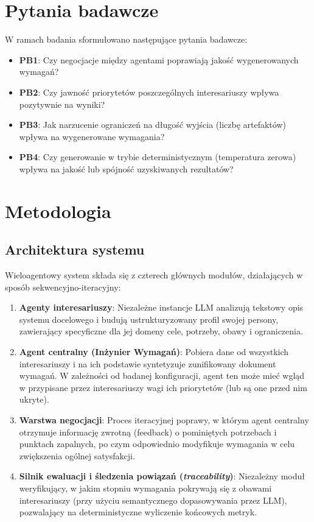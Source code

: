 \documentclass[conference]{IEEEtran}
\begin{document}
\section{Pytania badawcze}

W ramach badania sformułowano następujące pytania badawcze:

\begin{itemize}
\item \textbf{PB1}: Czy negocjacje między agentami poprawiają jakość wygenerowanych wymagań?
\item \textbf{PB2}: Czy jawność priorytetów poszczególnych interesariuszy wpływa pozytywnie na wyniki?
\item \textbf{PB3}: Jak narzucenie ograniczeń na długość wyjścia (liczbę artefaktów) wpływa na wygenerowane wymagania?
\item \textbf{PB4}: Czy generowanie w trybie deterministycznym (temperatura zerowa) wpływa na jakość lub spójność uzyskiwanych rezultatów?
\end{itemize}

\section{Metodologia}

\subsection{Architektura systemu}

Wieloagentowy system składa się z czterech głównych modułów, działających w sposób sekwencyjno-iteracyjny:

\begin{enumerate}
\item \textbf{Agenty interesariuszy}: Niezależne instancje LLM analizują tekstowy opis systemu docelowego i budują ustrukturyzowany profil swojej persony, zawierający specyficzne dla jej domeny cele, potrzeby, obawy i ograniczenia.
\item \textbf{Agent centralny (Inżynier Wymagań)}: Pobiera dane od wszystkich interesariuszy i na ich podstawie syntetyzuje zunifikowany dokument wymagań. W zależności od badanej konfiguracji, agent ten może mieć wgląd w przypisane przez interesariuszy wagi ich priorytetów (lub są one przed nim ukryte).
\item \textbf{Warstwa negocjacji}: Proces iteracyjnej poprawy, w którym agent centralny otrzymuje informację zwrotną (feedback) o pominiętych potrzebach i punktach zapalnych, po czym odpowiednio modyfikuje wymagania w celu zwiększenia ogólnej satysfakcji.
\item \textbf{Silnik ewaluacji i śledzenia powiązań (\textit{traceability})}: Niezależny moduł weryfikujący, w jakim stopniu wymagania pokrywają się z obawami interesariuszy (przy użyciu semantycznego dopasowywania przez LLM), pozwalający na deterministyczne wyliczenie końcowych metryk.
\end{enumerate}
\end{document}
